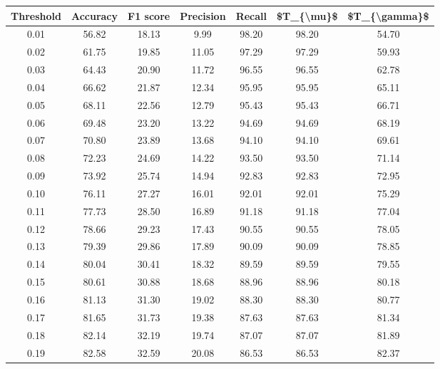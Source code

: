 \begin{tabular}{|c|c|c|c|c|c|c|}
\hline
 Threshold &  Accuracy &  F1 score &  Precision &  Recall &  \$T\_\{\textbackslash mu\}\$ &  \$T\_\{\textbackslash gamma\}\$ \\
\hline
      0.01 &     56.82 &     18.13 &       9.99 &   98.20 &      98.20 &         54.70 \\
      0.02 &     61.75 &     19.85 &      11.05 &   97.29 &      97.29 &         59.93 \\
      0.03 &     64.43 &     20.90 &      11.72 &   96.55 &      96.55 &         62.78 \\
      0.04 &     66.62 &     21.87 &      12.34 &   95.95 &      95.95 &         65.11 \\
      0.05 &     68.11 &     22.56 &      12.79 &   95.43 &      95.43 &         66.71 \\
      0.06 &     69.48 &     23.20 &      13.22 &   94.69 &      94.69 &         68.19 \\
      0.07 &     70.80 &     23.89 &      13.68 &   94.10 &      94.10 &         69.61 \\
      0.08 &     72.23 &     24.69 &      14.22 &   93.50 &      93.50 &         71.14 \\
      0.09 &     73.92 &     25.74 &      14.94 &   92.83 &      92.83 &         72.95 \\
      0.10 &     76.11 &     27.27 &      16.01 &   92.01 &      92.01 &         75.29 \\
      0.11 &     77.73 &     28.50 &      16.89 &   91.18 &      91.18 &         77.04 \\
      0.12 &     78.66 &     29.23 &      17.43 &   90.55 &      90.55 &         78.05 \\
      0.13 &     79.39 &     29.86 &      17.89 &   90.09 &      90.09 &         78.85 \\
      0.14 &     80.04 &     30.41 &      18.32 &   89.59 &      89.59 &         79.55 \\
      0.15 &     80.61 &     30.88 &      18.68 &   88.96 &      88.96 &         80.18 \\
      0.16 &     81.13 &     31.30 &      19.02 &   88.30 &      88.30 &         80.77 \\
      0.17 &     81.65 &     31.73 &      19.38 &   87.63 &      87.63 &         81.34 \\
      0.18 &     82.14 &     32.19 &      19.74 &   87.07 &      87.07 &         81.89 \\
      0.19 &     82.58 &     32.59 &      20.08 &   86.53 &      86.53 &         82.37 \\

\end{tabular}
